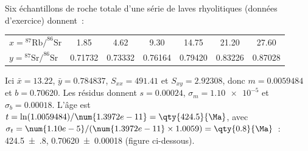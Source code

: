 \begin{example}\label{ex:b1:radiometric-methods:rhyolite}
Six échantillons de roche totale d'une série de laves rhyolitiques (données d'exercice) donnent~:
\begin{center}
\small
\begin{tabular}{|l|cccccc|}
\hline
$x = {}^{87}\mathrm{Rb}/^{86}\mathrm{Sr}$ & 1.85 & 4.62 & 9.30 & 14.75 & 21.20 & 27.60 \\
$y = {}^{87}\mathrm{Sr}/^{86}\mathrm{Sr}$ & 0.71732 & 0.73332 & 0.76164 & 0.79420 & 0.83226 & 0.87028 \\
\hline
\end{tabular}
\end{center}
Ici $\bar x = 13.22$, $\bar y = 0.784837$, $S_{xx} = 491.41$ et
$S_{xy} = 2.92308$, donc $m = 0.0059484$ et $b = 0.70620$. Les résidus donnent
$s = 0.00024$, $\sigma_m = \num{1.10e-5}$ et $\sigma_b = 0.00018$. L'âge est
$t = \ln(1.0059484)/\num{1.3972e-11} = \qty{424.5}{\Ma}$, avec
$\sigma_t = \num{1.10e-5}/(\num{1.3972e-11} \times 1.0059) = \qty{0.8}{\Ma}$~:
\qty[uncertainty-mode=separate]{424.5(8)}{\Ma}, 
\num[uncertainty-mode=separate]{0.70620(18)} (figure ci-dessous).
\end{example}

